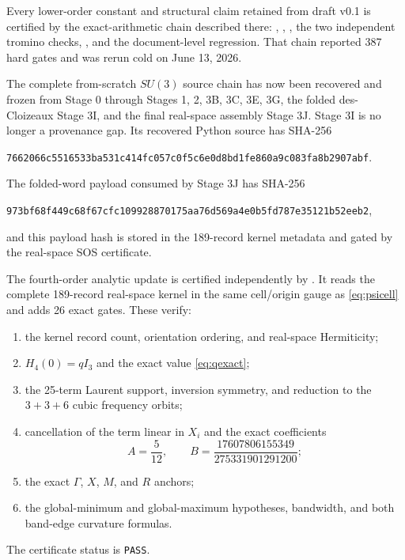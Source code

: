 \documentclass[11pt]{article}
\begin{document}
Every lower-order constant and structural claim retained from draft v0.1 is
certified by the exact-arithmetic chain described there:
, ,
, the two independent tromino checks,
, and the
document-level regression. That chain reported 387 hard gates and was rerun
cold on June 13, 2026.

The complete from-scratch $SU(3)$ source chain has now been recovered and
frozen from Stage 0 through Stages 1, 2, 3B, 3C, 3E, 3G, the folded
des-Cloizeaux Stage 3I, and the final real-space assembly Stage 3J. Stage 3I
is no longer a provenance gap. Its recovered Python source has SHA-256
\begin{center}
\texttt{7662066c5516533ba531c414fc057c0f5c6e0d8bd1fe860a9c083fa8b2907abf}.
\end{center}
The folded-word payload consumed by Stage 3J has SHA-256
\begin{center}
\texttt{973bf68f449c68f67cfc109928870175aa76d569a4e0b5fd787e35121b52eeb2},
\end{center}
and this payload hash is stored in the 189-record kernel metadata and gated by
the real-space SOS certificate.

The fourth-order analytic update is certified independently by
. It reads the
complete 189-record real-space kernel in the same cell/origin gauge as
\eqref{eq:psicell} and adds 26 exact gates. These verify:
\begin{enumerate}
\item the kernel record count, orientation ordering, and real-space
Hermiticity;
\item $H_4(0)=qI_3$ and the exact value \eqref{eq:qexact};
\item the 25-term Laurent support, inversion symmetry, and reduction to the
$3+3+6$ cubic frequency orbits;
\item cancellation of the term linear in $X_i$ and the exact coefficients
\[
A=\frac5{12},\qquad
B=\frac{17607806155349}{275331901291200};
\]
\item the exact $\Gamma$, $X$, $M$, and $R$ anchors;
\item the global-minimum and global-maximum hypotheses, bandwidth, and both
band-edge curvature formulas.
\end{enumerate}
The certificate status is \texttt{PASS}.
\end{document}
